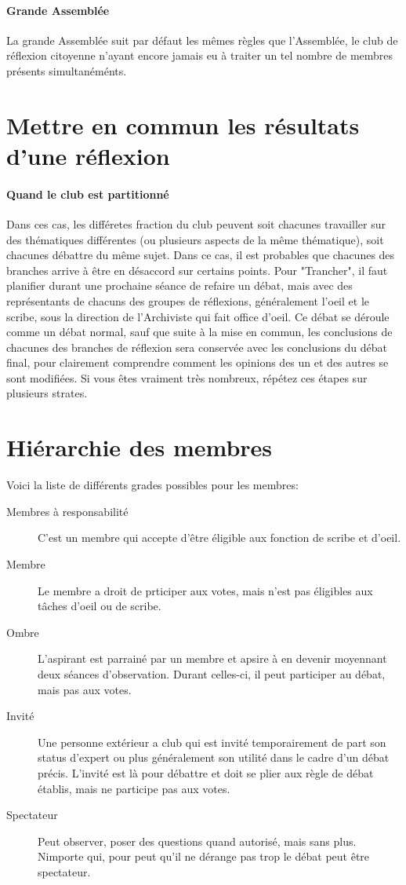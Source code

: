 \documentclass[a4paper,11pt]{article}
\begin{document}
\paragraph{Grande Assemblée}
La grande Assemblée suit par défaut les mêmes règles que l'Assemblée, le club de réflexion citoyenne n'ayant encore jamais eu à traiter un tel nombre de membres présents simultanéménts.

\section{Mettre en commun les résultats d'une réflexion}

\paragraph{Quand le club est partitionné}
Dans ces cas, les différetes fraction du club peuvent soit chacunes travailler sur des thématiques différentes (ou plusieurs aspects de la même thématique), soit chacunes débattre du même sujet. Dans ce cas, il est probables que chacunes des branches arrive à être en désaccord sur certains points. Pour "Trancher", il faut planifier durant une prochaine séance de refaire un débat, mais avec des représentants de chacuns des groupes de réflexions, généralement l'oeil et le scribe, sous la direction de l'Archiviste qui fait office d'oeil. Ce débat se déroule comme un débat normal, sauf que suite à la mise en commun, les conclusions de chacunes des branches de réflexion sera conservée avec les conclusions du débat final, pour clairement comprendre comment les opinions des un et des autres se sont modifiées. Si vous êtes vraiment très nombreux, répétez ces étapes sur plusieurs strates.

\section{Hiérarchie des membres}
Voici la liste de différents grades possibles pour les membres:
\begin{description}
 \item[Membres à responsabilité] C'est un membre qui accepte d'être éligible aux fonction de scribe et d'oeil.
 \item[Membre] Le membre a droit de prticiper aux votes, mais n'est pas éligibles aux tâches d'oeil ou de scribe.
 \item[Ombre] L'aspirant est parrainé par un membre et apsire à en devenir moyennant deux séances d'observation. Durant celles-ci, il peut participer au débat, mais pas aux votes.
 \item[Invité] Une personne extérieur a club qui est invité temporairement de part son status d'expert ou plus généralement son utilité dans le cadre d'un débat précis. L'invité est là pour débattre et doit se plier aux règle de débat établis, mais ne participe pas aux votes.
 \item[Spectateur] Peut observer, poser des questions quand autorisé, mais sans plus. Nimporte qui, pour peut qu'il ne dérange pas trop le débat peut être spectateur.
\end{description}
\end{document}
